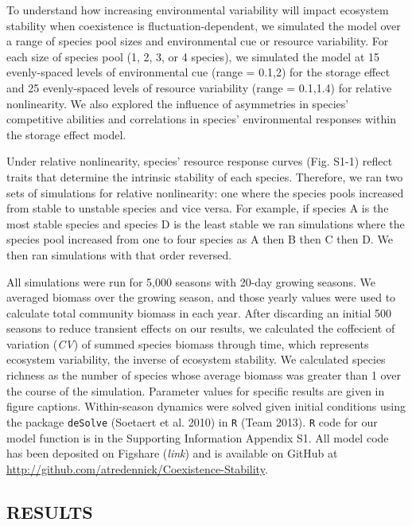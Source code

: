 \documentclass[12pt,]{article}
\begin{document}
To understand how increasing environmental variability will impact
ecosystem stability when coexistence is fluctuation-dependent, we
simulated the model over a range of species pool sizes and environmental
cue or resource variability. For each size of species pool (1, 2, 3, or
4 species), we simulated the model at 15 evenly-spaced levels of
environmental cue (range = 0.1,2) for the storage effect and 25
evenly-spaced levels of resource variability (range = 0.1,1.4) for
relative nonlinearity. We also explored the influence of asymmetries in
species' competitive abilities and correlations in species'
environmental responses within the storage effect model.

Under relative nonlinearity, species' resource response curves (Fig.
S1-1) reflect traits that determine the intrinsic stability of each
species. Therefore, we ran two sets of simulations for relative
nonlinearity: one where the species pools increased from stable to
unstable species and vice versa. For example, if species A is the most
stable species and species D is the least stable we ran simulations
where the species pool increased from one to four species as A then B
then C then D. We then ran simulations with that order reversed.

All simulations were run for 5,000 seasons with 20-day growing seasons.
We averaged biomass over the growing season, and those yearly values
were used to calculate total community biomass in each year. After
discarding an initial 500 seasons to reduce transient effects on our
results, we calculated the coffecient of variation (\emph{CV}) of summed
species biomass through time, which represents ecosystem variability,
the inverse of ecosystem stability. We calculated species richness as
the number of species whose average biomass was greater than 1 over the
course of the simulation. Parameter values for specific results are
given in figure captions. Within-season dynamics were solved given
initial conditions using the package \texttt{deSolve} (Soetaert et al.
2010) in \texttt{R} (Team 2013). \texttt{R} code for our model function
is in the Supporting Information Appendix S1. All model code has been
deposited on Figshare (\emph{link}) and is available on GitHub at
\url{http://github.com/atredennick/Coexistence-Stability}.

\subsection{RESULTS}\label{results}
\end{document}
